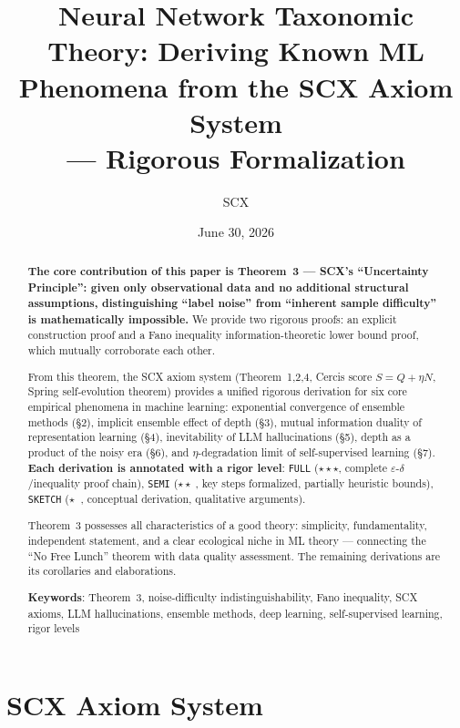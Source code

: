 \documentclass[12pt,a4paper]{article}
\title{Neural Network Taxonomic Theory: Deriving Known ML Phenomena from the SCX Axiom System\\
      --- Rigorous Formalization}
\author{SCX}
\date{June 30, 2026}
\theoremstyle{definition}
\theoremstyle{remark}
\begin{document}
\maketitle

\begin{abstract}
\textbf{The core contribution of this paper is Theorem~3 --- SCX's ``Uncertainty Principle'': given only observational data and no additional structural assumptions, distinguishing ``label noise'' from ``inherent sample difficulty'' is mathematically impossible.} We provide two rigorous proofs: an explicit construction proof and a Fano inequality information-theoretic lower bound proof, which mutually corroborate each other.

From this theorem, the SCX axiom system (Theorem~1,2,4, Cercis score $S = Q + \eta N$, Spring self-evolution theorem) provides a unified rigorous derivation for six core empirical phenomena in machine learning: exponential convergence of ensemble methods (\S2), implicit ensemble effect of depth (\S3), mutual information duality of representation learning (\S4), inevitability of LLM hallucinations (\S5), depth as a product of the noisy era (\S6), and $\eta$-degradation limit of self-supervised learning (\S7). \textbf{Each derivation is annotated with a rigor level}: \texttt{FULL} ($\star\star\star$, complete $\varepsilon$-$\delta$/inequality proof chain), \texttt{SEMI} ($\star\star\;$, key steps formalized, partially heuristic bounds), \texttt{SKETCH} ($\star\;\;$, conceptual derivation, qualitative arguments).

Theorem~3 possesses all characteristics of a good theory: simplicity, fundamentality, independent statement, and a clear ecological niche in ML theory --- connecting the ``No Free Lunch'' theorem with data quality assessment. The remaining derivations are its corollaries and elaborations.

\bigskip
\noindent\textbf{Keywords}: Theorem~3, noise-difficulty indistinguishability, Fano inequality, SCX axioms, LLM hallucinations, ensemble methods, deep learning, self-supervised learning, rigor levels
\end{abstract}

\tableofcontents

\section{SCX Axiom System}\label{scx-axioms}
\end{document}
